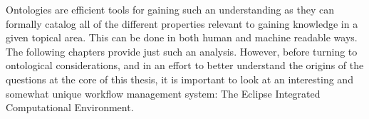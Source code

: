 Ontologies are efficient tools for gaining such an understanding as they
can formally catalog all of the different properties relevant to gaining
knowledge in a given topical area. This can be done in both human and machine
readable ways. The following chapters provide just such an analysis. However,
before turning to ontological considerations, and in an effort to better
understand the origins of the questions at the core of this thesis, it is
important to look at an interesting and somewhat unique workflow management
system: The Eclipse Integrated Computational Environment.

